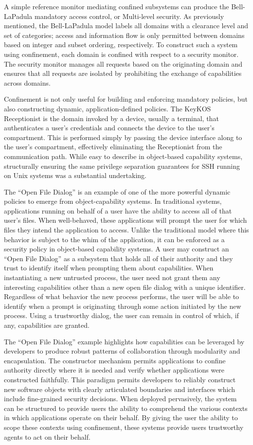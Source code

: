 A simple reference monitor mediating confined subsystems can produce the Bell-LaPadula \cite{BellLaPadula} mandatory access control, or Multi-level security.
As previously mentioned, the Bell-LaPadula model labels all domains with a clearance level and set of categories; access and information flow is only permitted between domains based on integer and subset ordering, respectively.
To construct such a system using confinement, each domain is confined with respect to a security monitor.
The security monitor manages all requests based on the originating domain and ensures that all requests are isolated by prohibiting the exchange of capabilities across domains.

Confinement is not only useful for building and enforcing mandatory policies, but also constructing dynamic, application-defined policies.
The KeyKOS Receptionist is the domain invoked by a device, usually a terminal, that authenticates a user's credentials and connects the device to the user's compartment.
This is performed simply by passing the device interface along to the user's compartment, effectively eliminating the Receptionist from the communication path.
While easy to describe in object-based capability systems, structurally ensuring the same privilege separation guarantees for SSH running on Unix systems was a substantial undertaking.

The ``Open File Dialog'' is an example of one of the more powerful dynamic policies to emerge from object-capability systems.
In traditional systems, applications running on behalf of a user have the ability to access all of that user's files.
When well-behaved, these applications will prompt the user for which files they intend the application to access.
Unlike the traditional model where this behavior is subject to the whim of the application, it can be enforced as a security policy in object-based capability systems.
A user may construct an ``Open File Dialog'' as a subsystem that holds all of their authority and they trust to identify itself when prompting them about capabilities.
When instantiating a new untrusted process, the user need not grant them any interesting capabilities other than a new open file dialog with a unique identifier.
Regardless of what behavior the new process performs, the user will be able to identify when a prompt is originating through some action initiated by the new process.
Using a trustworthy dialog, the user can remain in control of which, if any, capabilities are granted.

The ``Open File Dialog'' example highlights how capabilities can be leveraged by developers to produce robust patterns of collaboration through modularity and encapsulation.
The constructor mechanism permits applications to confine authority directly where it is needed and verify whether applications were constructed faithfully.
This paradigm permits developers to reliably construct new software objects with clearly articulated boundaries and interfaces which include fine-grained security decisions.
When deployed pervasively, the system can be structured to provide users the ability to comprehend the various contexts in which applications operate on their behalf.
By giving the user the ability to scope these contexts using confinement, these systems provide users trustworthy agents to act on their behalf.
